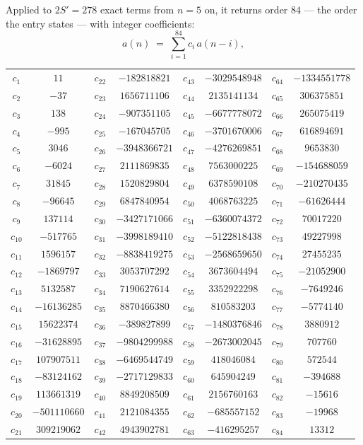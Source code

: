 \documentclass[11pt,a4paper]{article}
\theoremstyle{plain}
\theoremstyle{definition}
\begin{document}
Applied to $2S'=278$ exact terms from $n=5$ on, it returns order $84$ --- the
order the entry states --- with integer coefficients:
\[
a(n)\;=\;\sum_{i=1}^{84}c_i\,a(n-i),
\]
\begin{center}\small
\begin{tabular}{cccccccc}
$c_{1}$ & $11$ & $c_{22}$ & $-182818821$ & $c_{43}$ & $-3029548948$ & $c_{64}$ & $-1334551778$ \\
$c_{2}$ & $-37$ & $c_{23}$ & $1656711106$ & $c_{44}$ & $2135141134$ & $c_{65}$ & $306375851$ \\
$c_{3}$ & $138$ & $c_{24}$ & $-907351105$ & $c_{45}$ & $-6677778072$ & $c_{66}$ & $265075419$ \\
$c_{4}$ & $-995$ & $c_{25}$ & $-167045705$ & $c_{46}$ & $-3701670006$ & $c_{67}$ & $616894691$ \\
$c_{5}$ & $3046$ & $c_{26}$ & $-3948366721$ & $c_{47}$ & $-4276269851$ & $c_{68}$ & $9653830$ \\
$c_{6}$ & $-6024$ & $c_{27}$ & $2111869835$ & $c_{48}$ & $7563000225$ & $c_{69}$ & $-154688059$ \\
$c_{7}$ & $31845$ & $c_{28}$ & $1520829804$ & $c_{49}$ & $6378590108$ & $c_{70}$ & $-210270435$ \\
$c_{8}$ & $-96645$ & $c_{29}$ & $6847840954$ & $c_{50}$ & $4068763225$ & $c_{71}$ & $-61626444$ \\
$c_{9}$ & $137114$ & $c_{30}$ & $-3427171066$ & $c_{51}$ & $-6360074372$ & $c_{72}$ & $70017220$ \\
$c_{10}$ & $-517765$ & $c_{31}$ & $-3998189410$ & $c_{52}$ & $-5122818438$ & $c_{73}$ & $49227998$ \\
$c_{11}$ & $1596157$ & $c_{32}$ & $-8838419275$ & $c_{53}$ & $-2568659650$ & $c_{74}$ & $27455235$ \\
$c_{12}$ & $-1869797$ & $c_{33}$ & $3053707292$ & $c_{54}$ & $3673604494$ & $c_{75}$ & $-21052900$ \\
$c_{13}$ & $5132587$ & $c_{34}$ & $7190627614$ & $c_{55}$ & $3352922298$ & $c_{76}$ & $-7649246$ \\
$c_{14}$ & $-16136285$ & $c_{35}$ & $8870466380$ & $c_{56}$ & $810583203$ & $c_{77}$ & $-5774140$ \\
$c_{15}$ & $15622374$ & $c_{36}$ & $-389827899$ & $c_{57}$ & $-1480376846$ & $c_{78}$ & $3880912$ \\
$c_{16}$ & $-31628895$ & $c_{37}$ & $-9804299988$ & $c_{58}$ & $-2673002045$ & $c_{79}$ & $707760$ \\
$c_{17}$ & $107907511$ & $c_{38}$ & $-6469544749$ & $c_{59}$ & $418046084$ & $c_{80}$ & $572544$ \\
$c_{18}$ & $-83124162$ & $c_{39}$ & $-2717129833$ & $c_{60}$ & $645904249$ & $c_{81}$ & $-394688$ \\
$c_{19}$ & $113661319$ & $c_{40}$ & $8849208509$ & $c_{61}$ & $2156760163$ & $c_{82}$ & $-15616$ \\
$c_{20}$ & $-501110660$ & $c_{41}$ & $2121084355$ & $c_{62}$ & $-685557152$ & $c_{83}$ & $-19968$ \\
$c_{21}$ & $309219062$ & $c_{42}$ & $4943902781$ & $c_{63}$ & $-416295257$ & $c_{84}$ & $13312$ \\
\end{tabular}
\end{center}
\end{document}
